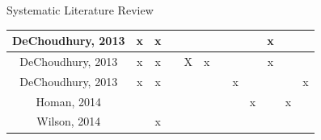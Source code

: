 \documentclass[aspectratio=169,10pt,xcolor={dvipsnames}]{beamer}
\begin{document}
\begin{frame}{Systematic Literature Review}
\begin{table}[]
{\begin{tabular}{c|c|c|c|c|c|c|ccc|c|c}
    DeChoudhury, 2013                       & x                                                               & x                 &                &                &                                                                     &                       & \multicolumn{1}{c|}{}                  & \multicolumn{1}{c|}{}                                                               & x             &                                                                  &                                                                         \\ \hline
    DeChoudhury, 2013                       & x                                                               & x                 &                & X              & x                                                                   &                       & \multicolumn{1}{c|}{}                  & \multicolumn{1}{c|}{}                                                               & x             &                                                                  &                                                                         \\ \hline
    DeChoudhury, 2013                       & x                                                               & x                 &                &                &                                                                     &                       & \multicolumn{1}{c|}{x}                 & \multicolumn{1}{c|}{}                                                               &               &                                                                  & x                                                                       \\ \hline
    Homan, 2014 \cite{Homan:2014:SSD:2531602.2531704}             &                                                                 &                   &                &                &                                                                     &                       & \multicolumn{1}{c|}{}                  & \multicolumn{1}{c|}{x}                                                              &               & x                                                                &                                                                         \\ \hline
    Wilson, 2014 \cite{Wilson:2014:FIM:2637002.2637006}           &                                                                 & x                 &                &                &                                                                     &                       & \multicolumn{1}{c|}{}                  & \multicolumn{1}{c|}{}                                                               &               &                                                                  &                                                                         \\ \hline

\end{tabular}}
\end{table}
\end{frame}
\end{document}
